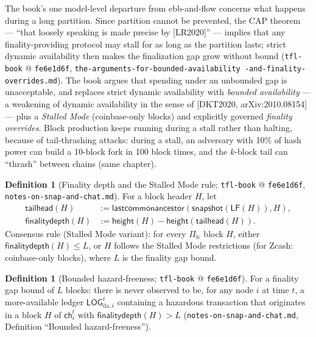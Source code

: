 \documentclass[11pt,a4paper]{article}
\theoremstyle{definition}
\newtheorem{definition}[theorem]{Definition}
\begin{document}
The book's one model-level departure from ebb-and-flow concerns what
happens during a long partition. Since partition cannot be prevented, the
CAP theorem --- ``that loosely speaking is made precise by [LR2020]'' ---
implies that any finality-providing protocol may stall for as long as the
partition lasts; strict dynamic availability then makes the finalization
gap grow without bound (\texttt{tfl-book} @ \texttt{fe6e1d6f},
\texttt{the-arguments-for-bounded-availability\allowbreak
-and-finality-overrides.md}). The book argues that spending under an
unbounded gap is unacceptable, and replaces strict dynamic availability
with \emph{bounded availability} --- a weakening of dynamic availability
in the sense of [DKT2020, arXiv:2010.08154] --- plus a \emph{Stalled Mode}
(coinbase-only blocks) and explicitly governed \emph{finality overrides}.
Block production keeps running during a stall rather than halting, because
of tail-thrashing attacks: during a stall, an adversary with 10\% of hash
power can build a 10-block fork in 100 block times, and the $k$-block tail
can ``thrash'' between chains (same chapter).

\begin{definition}[Finality depth and the Stalled Mode rule;
\texttt{tfl-book} @ \texttt{fe6e1d6f},
\texttt{notes-on-snap-and-chat.md}]\label{def:xl-finality-depth}
For a block header $H$, let
\begin{align*}
\mathsf{tailhead}(H) &:=
  \mathsf{lastcommonancestor}(\mathsf{snapshot}(\mathsf{LF}(H)), H), \\
\mathsf{finalitydepth}(H) &:=
  \mathsf{height}(H) - \mathsf{height}(\mathsf{tailhead}(H)).
\end{align*}
Consensus rule (Stalled Mode variant): for every $\Pi_{\mathrm{lc}}$ block
$H$, either $\mathsf{finalitydepth}(H) \le L$, or $H$ follows the Stalled
Mode restrictions (for Zcash: coinbase-only blocks), where $L$ is the
finality gap bound.
\end{definition}

\begin{definition}[Bounded hazard-freeness; \texttt{tfl-book} @
\texttt{fe6e1d6f}]
\label{def:xl-bounded-hazard}
For a finality gap bound of $L$ blocks: there is never observed to be,
for any node $i$ at time $t$, a more-available ledger
$\mathsf{LOG}_{\mathrm{da},i}^t$ containing a hazardous transaction that
originates in a block $H$ of $\mathsf{ch}_i^t$ with
$\mathsf{finalitydepth}(H) > L$
(\texttt{notes-on-snap-and-chat.md}, Definition ``Bounded
hazard-freeness'').
\end{definition}
\end{document}
